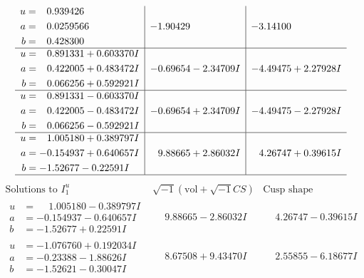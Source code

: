 \documentclass[1p]{elsarticle_modified}
\theoremstyle{definition}
\newcommand{\I}{\sqrt{-1}}
\begin{document}
$$\begin{array}{c|c|c}
\begin{aligned}
u &= \phantom{-}0.939426\phantom{ +0.000000I} \\
a &= \phantom{-}0.0259566\phantom{ +0.000000I} \\
b &= \phantom{-}0.428300\phantom{ +0.000000I}\end{aligned}
 & -1.90429\phantom{ +0.000000I} & -3.14100\phantom{ +0.000000I} \\ \hline\begin{aligned}
u &= \phantom{-}0.891331 + 0.603370 I \\
a &= \phantom{-}0.422005 + 0.483472 I \\
b &= \phantom{-}0.066256 + 0.592921 I\end{aligned}
 & -0.69654 - 2.34709 I & -4.49475 + 2.27928 I \\ \hline\begin{aligned}
u &= \phantom{-}0.891331 - 0.603370 I \\
a &= \phantom{-}0.422005 - 0.483472 I \\
b &= \phantom{-}0.066256 - 0.592921 I\end{aligned}
 & -0.69654 + 2.34709 I & -4.49475 - 2.27928 I \\ \hline\begin{aligned}
u &= \phantom{-}1.005180 + 0.389797 I \\
a &= -0.154937 + 0.640657 I \\
b &= -1.52677 - 0.22591 I\end{aligned}
 & \phantom{-}9.88665 + 2.86032 I & \phantom{-}4.26747 + 0.39615 I\\
 \hline 
 \end{array}$$\newpage$$\begin{array}{c|c|c}  
\text{Solutions to }I^u_{1}& \I (\text{vol} + \sqrt{-1}CS) & \text{Cusp shape}\\
 \hline 
\begin{aligned}
u &= \phantom{-}1.005180 - 0.389797 I \\
a &= -0.154937 - 0.640657 I \\
b &= -1.52677 + 0.22591 I\end{aligned}
 & \phantom{-}9.88665 - 2.86032 I & \phantom{-}4.26747 - 0.39615 I \\ \hline\begin{aligned}
u &= -1.076760 + 0.192034 I \\
a &= -0.23388 - 1.88626 I \\
b &= -1.52621 - 0.30047 I\end{aligned}
 & \phantom{-}8.67508 + 9.43470 I & \phantom{-}2.55855 - 6.18677 I \\ \hline\begin{aligned}

\end{aligned}
\end{array}$$
\end{document}
